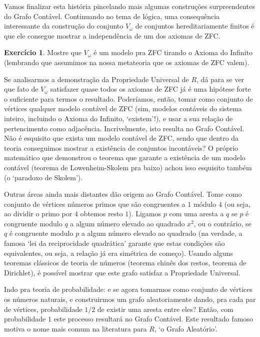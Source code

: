 \documentclass[11pt]{article}
\newcommand{\luamedio}{
\emoji{first-quarter-moon}
}
\theoremstyle{definition}
\theoremstyle{definition}
\theoremstyle{definition}
\theoremstyle{definition}
\theoremstyle{definition}
\theoremstyle{definition}
\theoremstyle{definition}
\theoremstyle{definition}
\theoremstyle{definition}
\theoremstyle{definition}
\theoremstyle{definition}
\theoremstyle{definition}
\theoremstyle{definition}
\newtheorem{exersisio}{Exercício}
\newenvironment{exercicio}{
\definecolor{shadecolor}{HTML}{CFB5FF}
\begin{shaded}
\begin{exersisio}
}
{
\end{exersisio}
\end{shaded}
}
\begin{document}
Vamos finalizar esta história pincelando mais algumas construções surpreendentes do Grafo Contável. Continuando no tema de lógica, uma consequência interessante da construção do conjunto $V_\omega$ de conjuntos hereditariamente finitos é que ele consegue mostrar a independência de um dos axiomas de ZFC.

\begin{exercicio}
    \luamedio Mostre que $V_\omega$ é um modelo pra ZFC tirando o Axioma do Infinito (lembrando que assumimos na nossa metateoria que os axiomas de ZFC valem).
\end{exercicio}

Se analisarmos a demonstração da Propriedade Universal de $R$, dá para se ver que fato de $V_\omega$ satisfazer quase todos os axiomas de ZFC já é uma hipótese forte o suficiente para termos o resultado. Poderíamos, então, tomar como conjunto de vértices qualquer modelo contável de ZFC (sim, modelos contáveis do sistema inteiro, incluindo o Axioma do Infinito, `existem'!), e usar a sua relação de pertencimento como adjacência. Incrivelmente, isto resulta no Grafo Contável. Não é esquisito que exista um modelo contável de ZFC, sendo que dentro da teoria conseguimos mostrar a existência de conjuntos incontáveis? O próprio matemático que demonstrou o teorema que garante a existência de um modelo contável (teorema de Lowenheim-Skolem pra baixo) achou isso esquisito também (o `paradoxo de Skolem').

Outras áreas ainda mais distantes dão origem ao Grafo Contável. Tome como conjunto de vértices números primos que são congruentes a $1$ módulo $4$ (ou seja, ao dividir o primo por $4$ obtemos resto $1$). Ligamos $p$ com uma aresta a $q$ se $p$ é congruente modulo $q$ a algum número elevado ao quadrado $x^2$, ou o contrário, se $q$ é congruente modulo $p$ a algum número elevado ao quadrado (na verdade, a famosa `lei da reciprocidade quadrática' garante que estas condições são equivalentes, ou seja, a relação já era simétrica de começo). Usando alguns teoremas clássicos de teoria de números (teorema chinês dos restos, teorema de Dirichlet), é possível mostrar que este grafo satisfaz a Propriedade Universal.

Indo pra teoria de probabilidade: e se agora tomarmos como conjunto de vértices os números naturais, e construirmos um grafo aleatoriamente dando, pra cada par de vértices, probabilidade $1/2$ de existir uma aresta entre eles? Então, com probabilidade $1$ este processo resultará no Grafo Contável. Este resultado famoso motiva o nome mais comum na literatura para $R$, `o Grafo Aleatório'.
\end{document}
